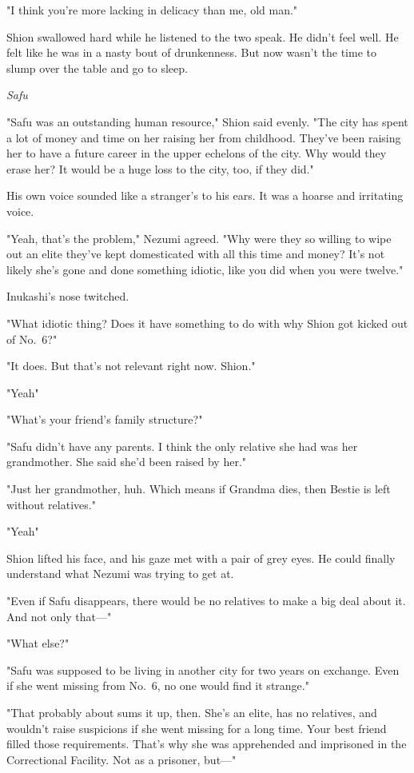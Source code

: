 "I think you're more lacking in delicacy than me, old man."

Shion swallowed hard while he listened to the two speak. He didn't feel
well. He felt like he was in a nasty bout of drunkenness. But now wasn't
the time to slump over the table and go to sleep.

\emph{Safu\el }

"Safu was an outstanding human resource," Shion said evenly. "The city
has spent a lot of money and time on her raising her from childhood.
They've been raising her to have a future career in the upper echelons
of the city. Why would they erase her? It would be a huge loss to the
city, too, if they did."

His own voice sounded like a stranger's to his ears. It was a hoarse and
irritating voice.

"Yeah, that's the problem," Nezumi agreed. "Why were they so willing to
wipe out an elite they've kept domesticated with all this time and
money? It's not likely she's gone and done something idiotic, like you
did when you were twelve."

Inukashi's nose twitched.

"What idiotic thing? Does it have something to do with why Shion got
kicked out of No.~6?"

"It does. But that's not relevant right now. Shion."

"Yeah\el "

"What's your friend's family structure?"

"Safu didn't have any parents. I think the only relative she had was her
grandmother. She said she'd been raised by her."

"Just her grandmother, huh. Which means if Grandma dies, then Bestie is
left without relatives."

"Yeah\el "

Shion lifted his face, and his gaze met with a pair of grey eyes. He
could finally understand what Nezumi was trying to get at.

"Even if Safu disappears, there would be no relatives to make a big deal
about it. And not only that---"

"What else?"

"Safu was supposed to be living in another city for two years on
exchange. Even if she went missing from No.~6, no one would find it
strange."

"That probably about sums it up, then. She's an elite, has no relatives,
and wouldn't raise suspicions if she went missing for a long time. Your
best friend filled those requirements. That's why she was apprehended
and imprisoned in the Correctional Facility. Not as a prisoner, but---"

